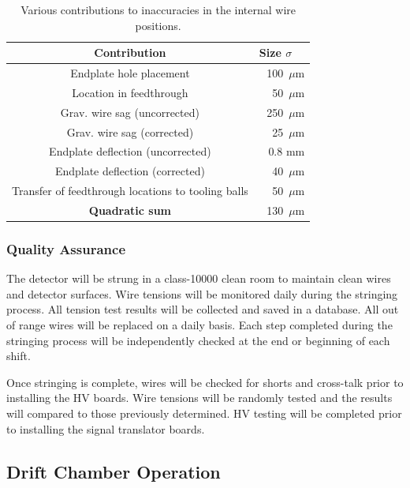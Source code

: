 \begin{table}[htbp]
\begin{center}
\begin{tabular} {||c|r||} \hline \hline
{\bf Contribution}                &  {\bf Size $\sigma$~~} \\ \hline
Endplate hole placement           & 100~$\mu$m \\ \hline
Location in feedthrough           & 50~$\mu$m \\ \hline
Grav. wire sag (uncorrected)      & 250~$\mu$m \\ \hline
Grav. wire sag (corrected)        & 25~$\mu$m \\ \hline
Endplate deflection (uncorrected) & 0.8 mm \\ \hline
Endplate deflection (corrected)   & 40~$\mu$m \\ \hline
Transfer of feedthrough locations to tooling balls & 50~$\mu$m \\ \hline
{\bf Quadratic sum}               & 130~$\mu$m \\ \hline \hline
\end{tabular}
\caption{\small{Various contributions to inaccuracies in the internal wire 
positions.}}
\label{errorbudget}
\end{center}
\end{table}

\subsubsection{Quality Assurance}

The detector will be strung in a class-10000 clean room to maintain clean 
wires and detector surfaces.  Wire tensions will be monitored daily during 
the stringing process.  All tension test results will be collected and saved 
in a database.  All out of range wires will be replaced on a daily basis.  
Each step completed during the stringing process will be independently 
checked at the end or beginning of each shift.

Once stringing is complete, wires will be checked for shorts and cross-talk 
prior to installing the HV boards.  Wire tensions will be randomly tested and 
the results will compared to those previously determined.  HV testing will be 
completed prior to installing the signal translator boards.

\subsection{Drift Chamber Operation}

